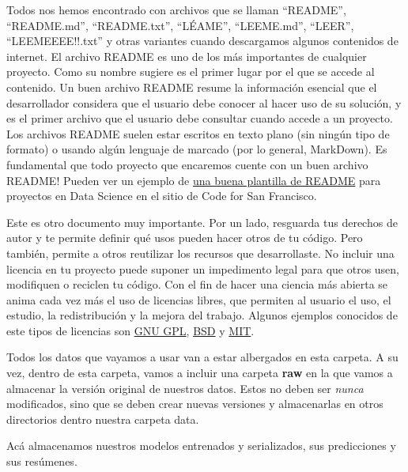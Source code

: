\documentclass[12pt,spanish,a4paper,]{article}
\providecommand{\tightlist}{%
  \setlength{\itemsep}{0pt}\setlength{\parskip}{0pt}}
\begin{document}
\begin{description}
\tightlist
\item[El archivo README]
Todos nos hemos encontrado con archivos que se llaman ``README'',
``README.md'', ``README.txt'', ``LÉAME'', ``LEEME.md'', ``LEER'',
``LEEMEEEE!!.txt'' y otras variantes cuando descargamos algunos
contenidos de internet. El archivo README es uno de los más importantes
de cualquier proyecto. Como su nombre sugiere es el primer lugar por el
que se accede al contenido. Un buen archivo README resume la información
esencial que el desarrollador considera que el usuario debe conocer al
hacer uso de su solución, y es el primer archivo que el usuario debe
consultar cuando accede a un proyecto. Los archivos README suelen estar
escritos en texto plano (sin ningún tipo de formato) o usando algún
lenguaje de marcado (por lo general, MarkDown). Es fundamental que todo
proyecto que encaremos cuente con un buen archivo README! Pueden ver un
ejemplo de
\href{https://github.com/sfbrigade/data-science-wg/blob/master/dswg_project_resources/Project-README-template.md}{una
buena plantilla de README} para proyectos en Data Science en el sitio de
Code for San Francisco.
\item[El archivo LICENSE]
Este es otro documento muy importante. Por un lado, resguarda tus
derechos de autor y te permite definir qué usos pueden hacer otros de tu
código. Pero también, permite a otros reutilizar los recursos que
desarrollaste. No incluir una licencia en tu proyecto puede suponer un
impedimento legal para que otros usen, modifiquen o reciclen tu código.
Con el fin de hacer una ciencia más abierta se anima cada vez más el uso
de licencias libres, que permiten al usuario el uso, el estudio, la
redistribución y la mejora del trabajo. Algunos ejemplos conocidos de
este tipos de licencias son
\href{https://www.gnu.org/licenses/gpl-3.0.txt}{GNU GPL},
\href{http://www.linfo.org/bsdlicense.html}{BSD} y
\href{https://opensource.org/licenses/MIT}{MIT}.
\item[El directorio data]
Todos los datos que vayamos a usar van a estar albergados en esta
carpeta. A su vez, dentro de esta carpeta, vamos a incluir una carpeta
\textbf{raw} en la que vamos a almacenar la versión original de nuestros
datos. Estos no deben ser \emph{nunca} modificados, sino que se deben
crear nuevas versiones y almacenarlas en otros directorios dentro
nuestra carpeta data.
\item[El directorio models]
Acá almacenamos nuestros modelos entrenados y serializados, sus
predicciones y sus resúmenes.

\end{description}
\end{document}
